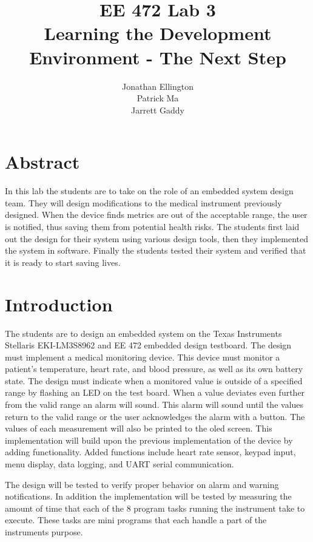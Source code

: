 \documentclass[12pt]{article} %
\title{\TitleFont EE 472 Lab 3 \\ Learning the Development Environment - The Next Step \vfill }
\author{\AuthorFont Jonathan Ellington \\ Patrick Ma \\ Jarrett Gaddy}
\date{}
\begin{document}
\maketitle
\thispagestyle{empty}
\pagebreak
\tableofcontents
\listoftables
\listoffigures
\thispagestyle{empty}
\pagebreak
\setcounter{page}{1}


\section{Abstract} In this lab the students are to take on the role of an
embedded system design team. They will design modifications to the medical
instrument previously designed. When the device finds metrics are out of the
acceptable range, the user is notified, thus saving them from potential health
risks. The students first laid out the design for their system using various
design tools, then they implemented the system in software. Finally the
students tested their system and verified that it is ready to start saving
lives. 

\section{Introduction} The students are to design an embedded system on the
Texas Instruments Stellaris EKI-LM3S8962 and EE 472 embedded design testboard.
The design must implement a medical monitoring device. This device must monitor
a patient's temperature, heart rate, and blood pressure, as well as its own
battery state.  The design must indicate when a monitored value is outside of a
specified range by flashing an LED on the test board. When a value deviates
even further from the valid range an alarm will sound. This alarm will sound
until the values return to the valid range or the user acknowledges the alarm
with a button. The values of each measurement will also be printed to the oled
screen. This implementation will build upon the previous implementation of the
device by adding functionality. Added functions include heart rate sensor,
keypad input, menu display, data logging, and UART serial communication.

The design will be tested to verify proper behavior on alarm and warning
notifications. In addition the implementation will be tested by measuring the
amount of time that each of the 8 program tasks running the instrument take to
execute. These tasks are mini programs that each handle a part of the
instruments purpose.
\end{document}
